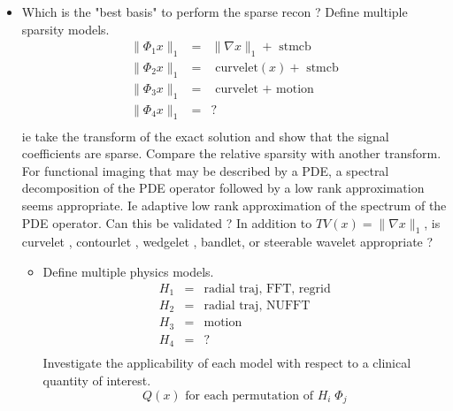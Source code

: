 \documentclass[10pt]{amsart}
\begin{document}
\begin{itemize}
   \item Which is the "best basis" to perform the sparse recon ?  
         Define multiple sparsity models.
         \begin{equation} \label{ModelSelectionSparsity}
         \begin{matrix}
           \| \Phi_1 x \|_1  &=&  \| \nabla x\|_1     +   \text{ stmcb}   \\
           \| \Phi_2 x \|_1  &=&  \text{ curvelet} (x)+   \text{ stmcb} \\
           \| \Phi_3 x \|_1  &=&  \text{ curvelet + motion}  \\
           \| \Phi_4 x \|_1  &=&   ?  \\
         \end{matrix}
         \end{equation}
         ie take the transform of the exact solution and show that the
         signal coefficients are sparse. Compare the relative sparsity with another transform. 
         For functional imaging that may be described by a PDE, a spectral decomposition of the
         PDE operator followed by a low rank approximation seems appropriate.
         Ie adaptive low rank approximation of the spectrum of the PDE operator.
         Can this be validated ?   In addition to $TV(x) = \|\nabla x \|_1$, 
         is curvelet \cite{candes2002recovering,candes2004new},
         contourlet \cite{do2003contourlets,do2003framing}, wedgelet \cite{donoho1999wedgelets}, 
         bandlet\cite{le2005sparse,le2005bandelet}, or 
         steerable wavelet \cite{freeman1991design,simoncelli1992shiftable} appropriate ? 
  \begin{itemize}
  \item  Define multiple physics models.
         \begin{equation} \label{ModelSelectionPhysics}
         \begin{matrix}
            H_1 &=& \text{radial traj, FFT, regrid} \\
            H_2 &=& \text{radial traj, NUFFT}  \\
            H_3 &=& \text{motion}   \\
            H_4 &=&  ?\\
         \end{matrix}
         \end{equation} 
         Investigate the
         applicability of each model with respect to a clinical quantity 
         of interest.
       \[
           Q(x)  \text{ for each permutation of }  H_i \; \Phi_j
\]
\end{itemize}
\end{itemize}
\end{document}

